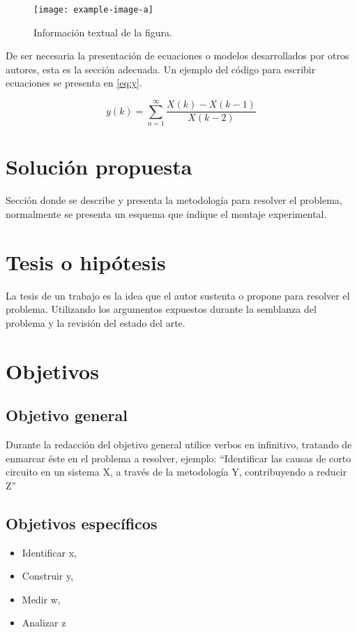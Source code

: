 \documentclass[twocolumns,a4paper]{IEEEtran}
\begin{document}
\begin{figure}[t!]
   \centering
   \texttt{[image: example-image-a]}
   \caption{Información textual de la figura.}\label{ref:FiguraA}
\end{figure}

De ser necesaria la presentación de ecuaciones o modelos desarrollados por
otros autores, esta es la sección adecuada. Un ejemplo del código para escribir
ecuaciones se presenta en \eqref{eq:y}.

\begin{equation}
   y(k)=\sum_{n=1}^{\infty}\frac{X(k)-X(k-1)}{X(k-2)}\label{eq:y}
\end{equation}

\section{Solución propuesta}
Sección donde se describe y presenta la metodología para resolver el problema,
normalmente se presenta un esquema que indique el montaje experimental.

\section{Tesis o hipótesis}
La tesis de un trabajo es la idea que el autor sustenta o propone para resolver
el problema. Utilizando los argumentos expuestos  durante la semblanza del
problema y la revisión del estado del arte.


\section{Objetivos}
\subsection{Objetivo general}
Durante la redacción del objetivo general utilice verbos en infinitivo,
tratando de enmarcar éste en el problema a resolver, ejemplo: ``Identificar las
causas de corto circuito en un sistema X, 
a través de  la metodología Y, contribuyendo  a reducir Z''

\subsection{Objetivos específicos}
\begin{itemize}
   \item  Identificar  x, 
   \item Construir y,
   \item Medir w, 
   \item Analizar  z
\end{itemize}
\end{document}
